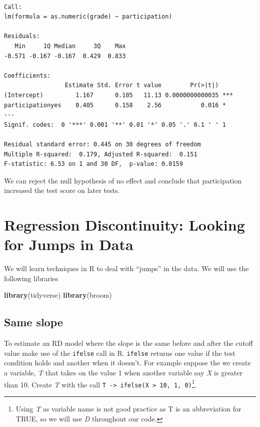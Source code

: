 \documentclass[]{book}
\newenvironment{Shaded}{\begin{snugshade}}{\end{snugshade}}
\newcommand{\KeywordTok}[1]{\textcolor[rgb]{0.13,0.29,0.53}{\textbf{#1}}}
\newcommand{\NormalTok}[1]{#1}
\let\rmarkdownfootnote\footnote%
\def\footnote{\protect\rmarkdownfootnote}
\begin{document}
\begin{verbatim}

Call:
lm(formula = as.numeric(grade) ~ participation)

Residuals:
   Min     1Q Median     3Q    Max 
-0.571 -0.167 -0.167  0.429  0.833 

Coefficients:
                 Estimate Std. Error t value        Pr(>|t|)    
(Intercept)         1.167      0.105   11.13 0.0000000000035 ***
participationyes    0.405      0.158    2.56           0.016 *  
---
Signif. codes:  0 '***' 0.001 '**' 0.01 '*' 0.05 '.' 0.1 ' ' 1

Residual standard error: 0.445 on 30 degrees of freedom
Multiple R-squared:  0.179, Adjusted R-squared:  0.151 
F-statistic: 6.53 on 1 and 30 DF,  p-value: 0.0159
\end{verbatim}

We can reject the null hypothesis of no effect and conclude that participation increased the test score on later tests.

\hypertarget{chp11}{%
\chapter{Regression Discontinuity: Looking for Jumps in Data}\label{chp11}}

We will learn techniques in R to deal with ``jumps'' in the data. We will use the following libraries

\begin{Shaded}
\begin{Highlighting}[]
\KeywordTok{library}\NormalTok{(tidyverse)}
\KeywordTok{library}\NormalTok{(broom)}
\end{Highlighting}
\end{Shaded}

\hypertarget{same-slope}{%
\section{Same slope}\label{same-slope}}

To estimate an RD model where the slope is the same before and after the cutoff value make use of the \texttt{ifelse} call in R. \texttt{ifelse} returns one value if the test condition holds and another when it doesn't. For example suppose the we create a variable, \emph{T} that takes on the value 1 when another variable say \emph{X} is greater than 10. Create \emph{T} with the call \texttt{T\ -\textgreater{}\ ifelse(X\ \textgreater{}\ 10,\ 1,\ 0)}\footnote{Using \emph{T} as variable name is not good practice as T is an abbreviation for TRUE, so we will use \emph{D} throughout our code.}.
\end{document}
